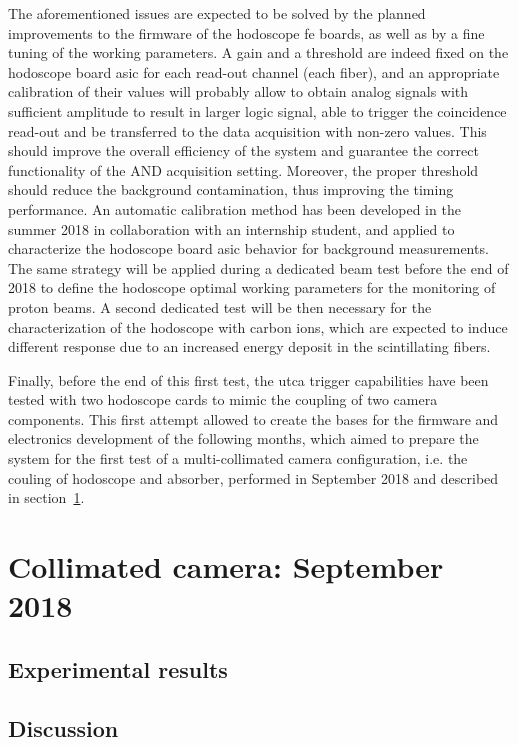The aforementioned issues are expected to be solved by the planned improvements to the firmware of the hodoscope \gls{fe} boards, as well as by a fine tuning of the working parameters. A gain and a threshold are indeed fixed on the hodoscope board \gls{asic} for each read-out channel (each fiber), and an appropriate calibration of their values will probably allow to obtain analog signals with sufficient amplitude to result in larger logic signal, able to trigger the coincidence read-out and be transferred to the data acquisition with non-zero values. This should improve the overall efficiency of the system and guarantee the correct functionality of the AND acquisition setting. Moreover, the proper threshold should reduce the background contamination, thus improving the timing performance. 
An automatic calibration method has been developed in the summer 2018 in collaboration with an internship student, and applied to characterize the hodoscope board \gls{asic} behavior for background measurements. The same strategy will be applied during a dedicated beam test before the end of 2018 to define the hodoscope optimal working parameters for the monitoring of proton beams. A second dedicated test will be then necessary for the characterization of the hodoscope with carbon ions, which are expected to induce different response due to an increased energy deposit in the scintillating fibers.
     
Finally, before the end of this first test, the \gls{utca} trigger capabilities have been tested with two hodoscope cards to mimic the coupling of two camera components. This first attempt allowed to create the bases for the firmware and electronics development of the following months, which aimed to prepare the system for the first test of a multi-collimated camera configuration, i.e. the couling of hodoscope and absorber, performed in September 2018 and described in section~\ref{chap6::sec::september2018}. 
\newpage

\section{Collimated camera: September 2018}\label{chap6::sec::september2018}

\subsection{Experimental results}\label{chap6::subsec::mayResults} 

\subsection{Discussion}\label{chap6::subsec::mayDiscussion} 

\clearpage
